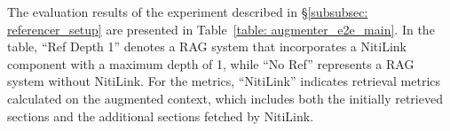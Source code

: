The evaluation results of the experiment described in \S\ref{subsubsec: referencer_setup} are presented in Table~\ref{table: augmenter_e2e_main}. 
%
In the table, ``Ref Depth 1'' denotes a RAG system that incorporates a NitiLink component with a maximum depth of 1, while \enquote{No Ref} represents a RAG system without NitiLink. 
%
For the metrics, ``NitiLink'' indicates retrieval metrics calculated on the augmented context, which includes both the initially retrieved sections and the additional sections fetched by NitiLink.

